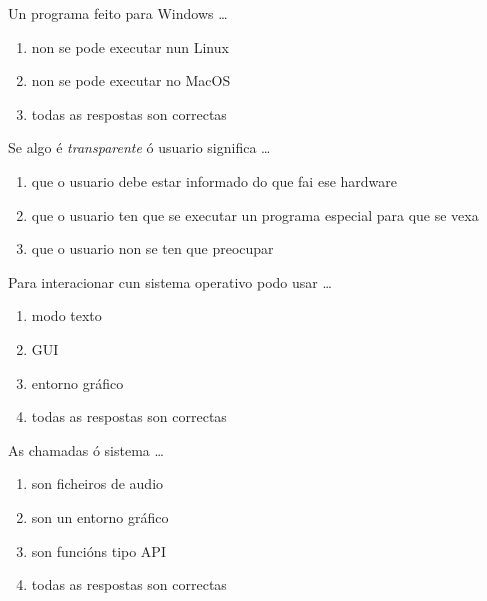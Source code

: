 \begin{diapo} \begin{frame}{ Un programa feito para Windows    \dots} 
\begin{enumerate}
	\item non se pode executar nun Linux\pause
	\item non se pode executar no MacOS \pause
	\item todas as respostas son correctas 	\pause
\end{enumerate} \end{frame}  \end{diapo}  
\begin{diapo}\begin{frame}{ Se algo é \textit{transparente} ó usuario significa  \dots}
\begin{enumerate}
	\item  que o usuario debe estar informado do que fai ese hardware\pause
	\item que o usuario ten que se executar un programa  especial para que se vexa 	\pause
	\item que o usuario non se ten que preocupar 	\pause
\end{enumerate} \end{frame} \end{diapo}



\begin{diapo}\begin{frame}{Para interacionar cun sistema operativo podo usar  \dots}
\begin{enumerate}
\item  modo texto \pause
\item GUI \pause
\item entorno gráfico  \pause
\item todas as respostas son correctas	\pause
\end{enumerate}
\end{frame}
\end{diapo}
\begin{diapo}
\begin{frame}{As chamadas ó sistema \dots}
\begin{enumerate}
\item  son ficheiros de audio \pause
\item son un entorno gráfico \pause
\item son funcións tipo API  \pause
\item todas as respostas son correctas
\end{enumerate}
\end{frame}
\end{diapo}



